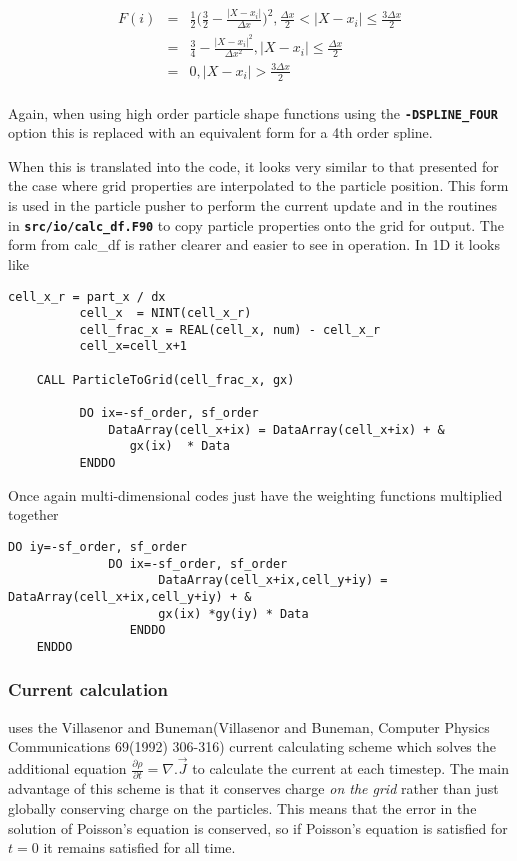 \documentclass[12pt,a4paper]{article}
\newcommand{\simpleboxverbatim}{\begin{Verbatim}[obeytabs=true,frame=single,
  framerule=0.5mm,rulecolor=\color{warwickmid},formatcom=\color{black}]}
\newcommand{\inlinecode}[1]{{\color{warwickred} \bf\texttt{#1}}}
\newcommand{\EPOCH}{{\color{warwickdark}\fontfamily{phv}\selectfont{EPOCH}}}
\begin{document}
\begin{eqnarray*}
  F(i) &=& \frac{1}{2} \bigl(\frac{3}{2} - \frac{|X - x_i|}{\Delta x} \bigr)^2, \frac{\Delta x}{2} < |X-x_i| \le \frac{3 \Delta x}{2}\\
  &=& \frac{3}{4} - \frac{|X-x_i|^2}{\Delta x^2}, |X-x_i| \le \frac{\Delta x}{2}\\
  &=& 0, |X-x_i| > \frac{3 \Delta x}{2}\\
\end{eqnarray*}

Again, when using high order particle shape functions using the
\inlinecode{-DSPLINE\_FOUR} option this is replaced with an equivalent form for
a 4th order spline.

When this is translated into the code, it looks very similar to that presented
for the case where grid properties are interpolated to the particle
position. This form is used in the particle pusher to perform the current
update and in the routines in \inlinecode{src/io/calc\_df.F90} to copy particle
properties onto the grid for output. The form from calc\_df is rather clearer
and easier to see in operation. In 1D it looks like

\simpleboxverbatim
          cell_x_r = part_x / dx
          cell_x  = NINT(cell_x_r)
          cell_frac_x = REAL(cell_x, num) - cell_x_r
          cell_x=cell_x+1

	CALL ParticleToGrid(cell_frac_x, gx)

          DO ix=-sf_order, sf_order
              DataArray(cell_x+ix) = DataArray(cell_x+ix) + &
                 gx(ix)  * Data
          ENDDO
\end{Verbatim}

Once again multi-dimensional codes just have the weighting functions multiplied
together
\simpleboxverbatim
	DO iy=-sf_order, sf_order
	          DO ix=-sf_order, sf_order
         		     DataArray(cell_x+ix,cell_y+iy) = DataArray(cell_x+ix,cell_y+iy) + &
	                 gx(ix) *gy(iy) * Data
         		 ENDDO
	ENDDO
\end{Verbatim}

\subsubsection{Current calculation}
{\EPOCH} uses the Villasenor and Buneman(Villasenor and Buneman, Computer Physics
Communications 69(1992) 306-316) current calculating scheme which solves the
additional equation $\frac{\partial \rho}{\partial t} = \nabla . \vec{J}$ to
calculate the current at each timestep. The main advantage of this scheme is
that it conserves charge {\it on the grid} rather than just globally conserving
charge on the particles. This means that the error in the solution of Poisson's
equation is conserved, so if Poisson's equation is satisfied for $t=0$ it
remains satisfied for all time.\\
\end{document}
